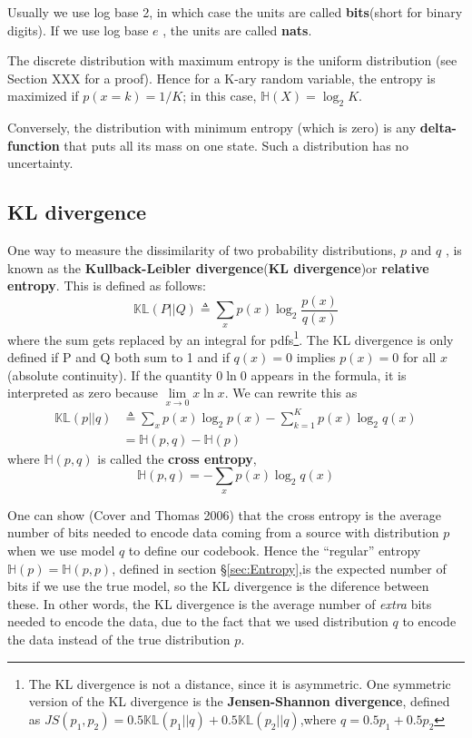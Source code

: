 \documentclass[graybox, envcountchap, twocolumn]{styles/svmult}
\begin{document}
Usually we use log base 2, in which case the units are called \textbf{bits}(short for binary digits). If we use log base $e$ , the units are called \textbf{nats}. 

The discrete distribution with maximum entropy is the uniform distribution (see Section XXX for a proof). Hence for a K-ary random variable, the entropy is maximized if $p(x = k)=1/K$; in this case, $\mathbb{H}(X)=\log_2K$. 

Conversely, the distribution with minimum entropy (which is zero) is any \textbf{delta-function} that puts all its mass on one state. Such a distribution has no uncertainty.


\subsection{KL divergence}
One way to measure the dissimilarity of two probability distributions, $p$ and $q$ , is known as the \textbf{Kullback-Leibler divergence}(\textbf{KL divergence})or \textbf{relative entropy}. This is defined as follows:
\begin{equation}
\mathbb{KL}(P||Q) \triangleq 
\sum\limits_{x}{p(x)\log_2\dfrac{p(x)}{q(x)}}
\end{equation}
where the sum gets replaced by an integral for pdfs\footnote{The KL divergence is not a distance, since it is asymmetric. One symmetric version of the KL divergence is the \textbf{Jensen-Shannon divergence}, defined as $JS(p_1,p_2)=0.5\mathbb{KL}(p_1||q)+0.5\mathbb{KL}(p_2||q)$,where $q=0.5p_1+0.5p_2$}. The KL divergence is only defined if P and Q both sum to 1 and if $q(x)=0$ implies $p(x)=0$ for all $x$(absolute continuity). If the quantity  $0\ln0$ appears in the formula, it is interpreted as zero because $\lim\limits_{x \to 0}x\ln x$. We can rewrite this as
\begin{equation}\begin{split}
\mathbb{KL}(p||q) & \triangleq \sum\limits_{x}{p(x)\log_2p(x)}-\sum\limits_{k=1}^{K}{p(x)\log_2q(x)} \\
    & =\mathbb{H}(p,q)-\mathbb{H}(p)
\end{split}\end{equation}
where $\mathbb{H}(p,q)$ is called the \textbf{cross entropy},
\begin{equation}\label{eqn:cross-entropy}
\mathbb{H}(p,q)=-\sum\limits_{x}{p(x)\log_2q(x)}
\end{equation}

One can show (Cover and Thomas 2006) that the cross entropy is the average number of bits needed to encode data coming from a source with distribution $p$ when we use model $q$ to define our codebook. Hence the “regular” entropy $\mathbb{H}(p)=\mathbb{H}(p,p)$, defined in section \S \ref{sec:Entropy},is the expected number of bits if we use the true model, so the KL divergence is the diference between these. In other words, the KL divergence is the average number of \emph{extra} bits needed to encode the data, due to the fact that we used distribution $q$ to encode the data instead of the true distribution $p$.
\end{document}
